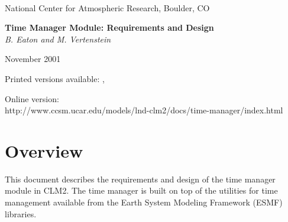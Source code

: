 \documentclass[12pt]{article}
\begin{document}

\begin{titlepage}

\begin{latexonly}
 \\
\noindent National Center for Atmospheric Research, Boulder, CO \\
\vspace{2in}
\end{latexonly}

\begin{center}
{\Large\bf Time Manager Module: Requirements and Design} \\

\bigskip
{\it B. Eaton and M. Vertenstein }

 November 2001
\end{center}

\begin{htmlonly}
\begin{flushleft}
Printed versions available:
,
\end{flushleft}
\end{htmlonly}

\begin{latexonly}
\vspace{2in}
\begin{flushleft}
Online version:\\
http://www.ccsm.ucar.edu/models/lnd-clm2/docs/time-manager/index.html
\end{flushleft}
\end{latexonly}

\end{titlepage}

\tableofcontents
\newpage

\section{Overview}

This document describes the requirements and design of the time manager
module in CLM2.  The time manager is built
on top of the utilities for time management available from the Earth System
Modeling Framework (ESMF) \cite{esmf} libraries.
\end{document}
